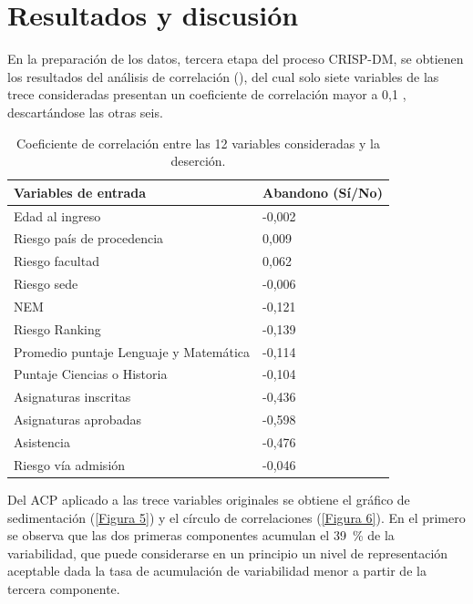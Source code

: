\documentclass[portuguese]{textolivre}
\begin{document}
\section{Resultados y discusión}\label{sec-modelo}

En la preparación de los datos, tercera etapa del proceso CRISP-DM, se obtienen los resultados del análisis de correlación (), del cual solo siete variables de las trece consideradas presentan un coeficiente de correlación mayor a 0,1 \cite{Hernandez2018}, descartándose las otras seis.

\begin{table}[htpb]
    \caption{Coeficiente de correlación entre las 12 variables consideradas y la deserción.}
    \label{Tabla 4}
    \centering
    \begin{tabular}{ll}
    \toprule
    Variables de entrada & Abandono (Sí/No)\\
    \midrule
    Edad al ingreso & -0,002\\
    Riesgo país de procedencia & 0,009\\
    Riesgo facultad & 0,062\\
    Riesgo sede & -0,006\\
    NEM & -0,121\\
    Riesgo Ranking & -0,139\\
    Promedio puntaje Lenguaje y Matemática & -0,114\\
    Puntaje Ciencias o Historia & -0,104\\
    Asignaturas inscritas & -0,436\\
    Asignaturas aprobadas & -0,598\\
    Asistencia & -0,476\\
    Riesgo vía admisión & -0,046\\
    \bottomrule
    \end{tabular}
\end{table}

Del ACP aplicado a las trece variables originales se obtiene el gráfico de sedimentación (\cref{Figura 5}) y el círculo de correlaciones (\cref{Figura 6}). En el primero se observa que las dos primeras componentes acumulan el 39~\% de la variabilidad, que puede considerarse en un principio un nivel de representación aceptable dada la tasa de acumulación de variabilidad menor a partir de la tercera componente.
\end{document}
